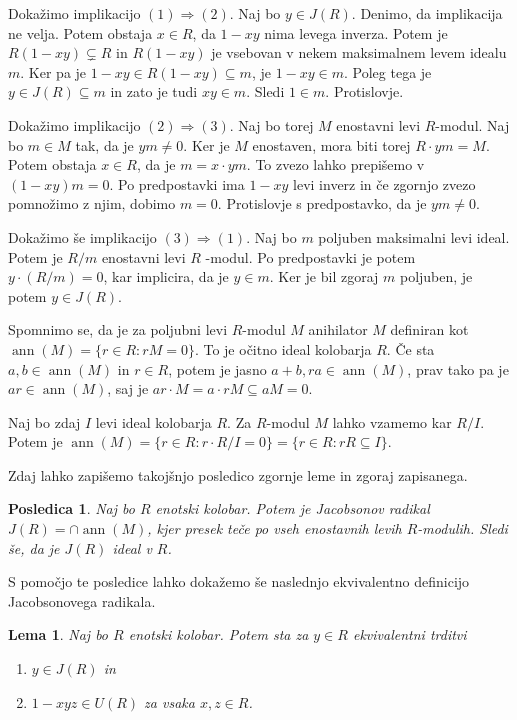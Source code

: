 \documentclass[a4paper, 12pt]{amsart}
\theoremstyle{definition} %
\theoremstyle{plain} %
\newtheorem{lema}[definicija]{Lema}
\newtheorem{posledica}[definicija]{Posledica}
\DeclareMathOperator{\ann}{ann}
\begin{document}
\proof
Dokažimo implikacijo $(1) \Rightarrow (2)$. Naj bo $y\in J(R)$. Denimo, da implikacija ne velja. Potem obstaja $x\in R$, da $1-xy$ nima levega inverza. Potem je $R(1-xy) \subsetneq R$ in $R(1-xy)$ je vsebovan v nekem maksimalnem levem idealu $m$. Ker pa je $1-xy \in R(1-xy) \subseteq m$, je $1-xy\in m$. Poleg tega je $y\in J(R) \subseteq m$ in zato je tudi $xy \in m$. Sledi $1\in m$. Protislovje.

Dokažimo implikacijo $(2) \Rightarrow (3)$. Naj bo torej $M$ enostavni levi $R$-modul. Naj bo $m\in M$ tak, da je $ym \neq 0$. Ker je $M$ enostaven, mora biti torej $R\cdot ym = M$. Potem obstaja $x\in R$, da je $m = x\cdot ym$. To zvezo lahko prepišemo v $(1-xy)m=0$. Po predpostavki ima $1-xy$ levi inverz in če zgornjo zvezo pomnožimo z njim, dobimo $m=0$. Protislovje s predpostavko, da je $ym\neq 0$.

Dokažimo še implikacijo $(3) \Rightarrow (1)$. Naj bo $m$ poljuben maksimalni levi ideal. Potem je $R/m$ enostavni levi $R$ -modul. Po predpostavki je potem $y  \cdot ( R/m) = 0$, kar implicira, da je $y\in m$. Ker je bil zgoraj $m$ poljuben, je potem $y\in J(R)$.
\endproof

Spomnimo se, da je za poljubni levi $R$-modul $M$ anihilator $M$ definiran kot $\ann(M) = \{r\in R: rM = 0\}$. To je očitno ideal kolobarja $R$. Če sta $a,b\in \ann(M)$ in $r\in R$, potem je jasno $a+b, ra\in \ann(M)$, prav tako pa je $ar\in \ann(M)$, saj je $ar\cdot M = a \cdot rM \subseteq a M =0$.

Naj bo zdaj $I$ levi ideal kolobarja $R$. Za $R$-modul $M$ lahko vzamemo kar $R/I$. Potem je $\ann(M) = \{r\in R: r\cdot R/I = 0\} = \{ r\in R: rR \subseteq I\}$.

Zdaj lahko zapišemo takojšnjo posledico zgornje leme in zgoraj zapisanega. 
\begin{posledica}
\label{J(R)-presekAnihilatorjev}
Naj bo $R$ enotski kolobar. Potem je Jacobsonov radikal $J(R) = \cap \ann(M)$, kjer presek teče po vseh enostavnih levih $R$-modulih. Sledi še, da je $J(R)$ ideal v $R$.
\end{posledica}

S pomočjo te posledice lahko dokažemo še naslednjo ekvivalentno definicijo Jacobsonovega radikala.

\begin{lema}
\label{J(R)-drugic}
Naj bo $R$ enotski kolobar. Potem sta za $y\in R$ ekvivalentni trditvi
\begin{enumerate}
\item $y\in J(R)$ in 
\item $1 - xyz \in U(R)$ za vsaka $x,z\in R$.
\end{enumerate}
\end{lema}
\end{document}
